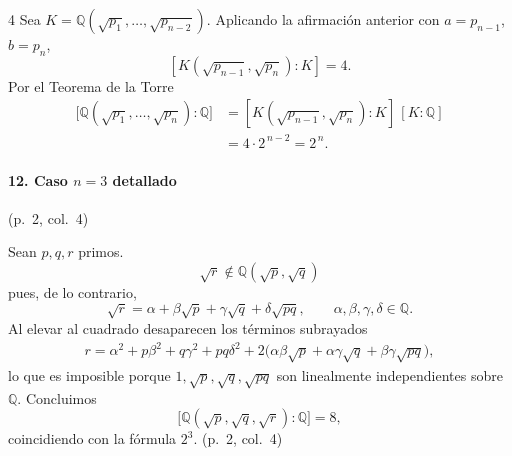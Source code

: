 \documentclass[landscape,a4paper]{article}
\begin{document}
\begin{multicols}{4}
Sea $K=\mathbb{Q}(\sqrt{p_{1}},\dots,\sqrt{p_{n-2}})$.
Aplicando la afirmación anterior con $a=p_{n-1}$, $b=p_{n}$,
\[
[K(\sqrt{p_{n-1}},\sqrt{p_{n}}):K]=4.
\]
Por el Teorema de la Torre
\begin{align}
\bigl[\mathbb{Q}(\sqrt{p_{1}},\dots,\sqrt{p_{n}}):\mathbb{Q}\bigr]
&=[K(\sqrt{p_{n-1}},\sqrt{p_{n}}):K]\,[K:\mathbb{Q}]\\
&=4\cdot 2^{\,n-2}=2^{\,n}. \tag*{(p.~2, col.~3)}
\end{align}
\paragraph{12. Caso $n=3$ detallado}\hfill(p.~2, col.~4)

Sean $p,q,r$ primos.  
\[
\sqrt{r}\notin\mathbb{Q}(\sqrt{p},\sqrt{q})
\]
pues, de lo contrario,
\[
\sqrt{r}=\alpha+\beta\sqrt{p}+\gamma\sqrt{q}+\delta\sqrt{pq},
\qquad \alpha,\beta,\gamma,\delta\in\mathbb{Q}.
\]
Al elevar al cuadrado desaparecen los términos subrayados
\begin{align}
r = \alpha^{2} + p\beta^{2} + q\gamma^{2} + pq\delta^{2}
    + 2\bigl(\alpha\beta\sqrt{p}+\alpha\gamma\sqrt{q}+\beta\gamma\sqrt{pq}\bigr),
\end{align}
lo que es imposible porque $1,\sqrt{p},\sqrt{q},\sqrt{pq}$ son linealmente independientes sobre $\mathbb{Q}$.  
Concluimos
\[
\bigl[\mathbb{Q}(\sqrt{p},\sqrt{q},\sqrt{r}):\mathbb{Q}\bigr]=8,
\]
coincidiendo con la fórmula $2^{3}$. \hfill(p.~2, col.~4)

\end{multicols}
\end{document}
